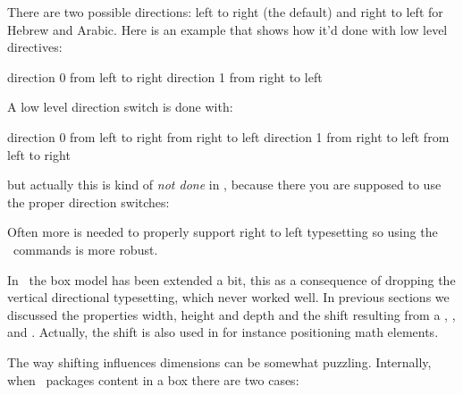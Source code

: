 \stopsection

\startsection[title={\LUAMETATEX\ primitives}]

There are two possible directions: left to right (the default) and right to left
for Hebrew and Arabic. Here is an example that shows how it'd done with low level
directives:

\startbuffer
\hbox direction 0 {from left to right}
\hbox direction 1 {from right to left}
\stopbuffer

\typebuffer[option=TEX]

\startlinecorrection
\getbuffer
\stoplinecorrection

A low level direction switch is done with:

\startbuffer
\hbox direction 0
    {from left to right  from right to left}
\hbox direction 1
    {from right to left  from left to right}
\stopbuffer

\typebuffer[option=TEX]

\startlinecorrection
\getbuffer
\stoplinecorrection

but actually this is kind of {\em not done} in \CONTEXT, because there you are
supposed to use the proper direction switches:

\startbuffer
{}
\stopbuffer

\typebuffer[option=TEX]

\startlinecorrection
\getbuffer
\stoplinecorrection

Often more is needed to properly support right to left typesetting so using the
\CONTEXT\ commands is more robust.

In \LUAMETATEX\ the box model has been extended a bit, this as a consequence of
dropping the vertical directional typesetting, which never worked well. In
previous sections we discussed the properties width, height and depth and the
shift resulting from a \type {\raise}, \type {\lower}, \type {\moveleft} and
\type {\moveright}. Actually, the shift is also used in for instance positioning
math elements.

The way shifting influences dimensions can be somewhat puzzling. Internally, when
\TEX\ packages content in a box there are two cases:

